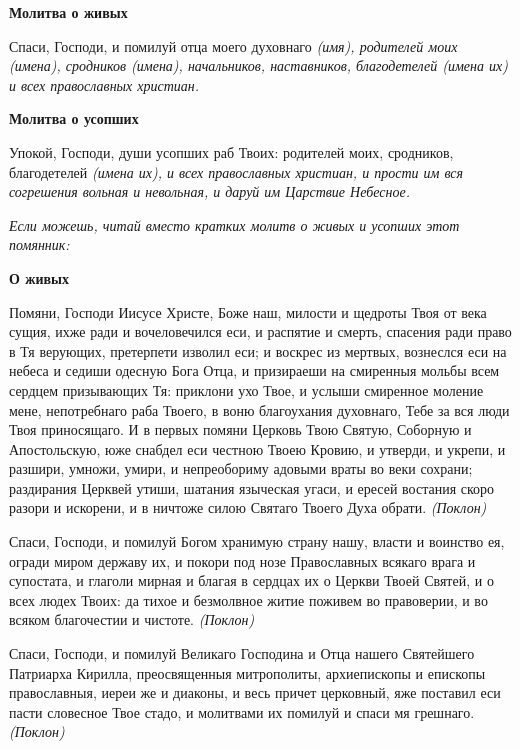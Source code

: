  

\bfseries Молитва о живых\normalfont{}


   Спаси, Господи, и помилуй отца моего духовнаго \itshape  (имя)\normalfont{}, родителей моих \itshape 
(имена)\normalfont{}, сродников \itshape  (имена)\normalfont{}, начальников, наставников, благодетелей \itshape 
(имена их)\normalfont{} и всех православных христиан.



 

\bfseries Молитва о усопших\normalfont{}


   Упокой, Господи, души усопших раб Твоих: родителей моих, сродников,
благодетелей \itshape (имена их)\normalfont{}, и всех православных христиан, и прости им вся
согрешения вольная и невольная, и даруй им Царствие Небесное.




 \itshape  Если можешь, читай вместо кратких молитв о живых и усопших этот
помянник:\normalfont{}



 

\bfseries О живых\normalfont{}


   Помяни, Господи Иисусе Христе, Боже наш, милости и щедроты Твоя от
века сущия, ихже ради и вочеловечился еси, и распятие и смерть, спасения
ради право в Тя верующих, претерпети изволил еси; и воскрес из мертвых,
вознеслся еси на небеса и седиши одесную Бога Отца, и призираеши на
смиренныя мольбы всем сердцем призывающих Тя: приклони ухо Твое, и
услыши смиренное моление мене, непотребнаго раба Твоего, в воню
благоухания духовнаго, Тебе за вся люди Твоя приносящаго. И в первых
помяни Церковь Твою Святую, Соборную и Апостольскую, юже снабдел еси
честною Твоею Кровию, и утверди, и укрепи, и разшири, умножи,
умири, и непреобориму адовыми враты во веки сохрани; раздирания
Церквей утиши, шатания языческая угаси, и ересей востания скоро
разори и искорени, и в ничтоже силою Святаго Твоего Духа обрати. \itshape 
(Поклон)\normalfont{}



   Спаси, Господи, и помилуй Богом хранимую страну нашу, власти и
воинство ея, огради миром державу их, и покори под нозе Православных
всякаго врага и супостата, и глаголи мирная и благая в сердцах их о
Церкви Твоей Святей, и о всех людех Твоих: да тихое и безмолвное
житие поживем во правоверии, и во всяком благочестии и чистоте. \itshape 
(Поклон)\normalfont{}



   Спаси, Господи, и помилуй Великаго Господина и Отца нашего Святейшего
Патриарха Кирилла, преосвященныя митрополиты, архиепископы и
епископы православныя, иереи же и диаконы, и весь причет церковный, яже
поставил еси пасти словесное Твое стадо, и молитвами их помилуй и спаси
мя грешнаго. \itshape  (Поклон)\normalfont{}



